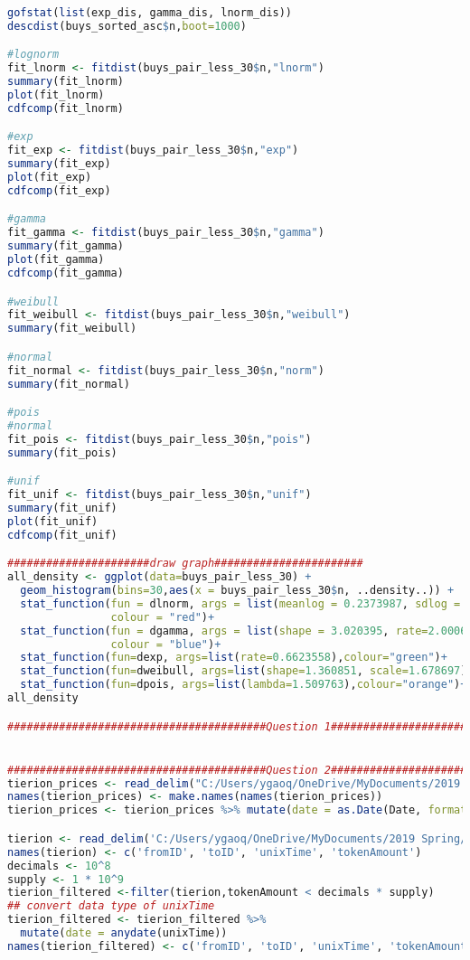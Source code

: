 \begin{lstlisting}[language=R]
gofstat(list(exp_dis, gamma_dis, lnorm_dis))
descdist(buys_sorted_asc$n,boot=1000)

#lognorm
fit_lnorm <- fitdist(buys_pair_less_30$n,"lnorm")
summary(fit_lnorm)
plot(fit_lnorm)
cdfcomp(fit_lnorm)

#exp
fit_exp <- fitdist(buys_pair_less_30$n,"exp")
summary(fit_exp)
plot(fit_exp)
cdfcomp(fit_exp)

#gamma
fit_gamma <- fitdist(buys_pair_less_30$n,"gamma")
summary(fit_gamma)
plot(fit_gamma)
cdfcomp(fit_gamma)

#weibull
fit_weibull <- fitdist(buys_pair_less_30$n,"weibull")
summary(fit_weibull)

#normal
fit_normal <- fitdist(buys_pair_less_30$n,"norm")
summary(fit_normal)

#pois
#normal
fit_pois <- fitdist(buys_pair_less_30$n,"pois")
summary(fit_pois)

#unif
fit_unif <- fitdist(buys_pair_less_30$n,"unif")
summary(fit_unif)
plot(fit_unif)
cdfcomp(fit_unif)

######################draw graph#######################
all_density <- ggplot(data=buys_pair_less_30) +
  geom_histogram(bins=30,aes(x = buys_pair_less_30$n, ..density..)) +
  stat_function(fun = dlnorm, args = list(meanlog = 0.2373987, sdlog = 0.4791316),
                colour = "red")+
  stat_function(fun = dgamma, args = list(shape = 3.020395, rate=2.000602),
                colour = "blue")+
  stat_function(fun=dexp, args=list(rate=0.6623558),colour="green")+
  stat_function(fun=dweibull, args=list(shape=1.360851, scale=1.678697),colour="yellow")+
  stat_function(fun=dpois, args=list(lambda=1.509763),colour="orange")+  xlab("No.Buys")
all_density

########################################Question 1############################################


########################################Question 2############################################
tierion_prices <- read_delim("C:/Users/ygaoq/OneDrive/MyDocuments/2019 Spring/Statistics/Project/Blockchain-Tokens-Data-Analytics/tierion", delim = "\t", col_names = T) #load token price data
names(tierion_prices) <- make.names(names(tierion_prices))
tierion_prices <- tierion_prices %>% mutate(date = as.Date(Date, format = '%m/%d/%Y'))

tierion <- read_delim('C:/Users/ygaoq/OneDrive/MyDocuments/2019 Spring/Statistics/Project/Blockchain-Tokens-Data-Analytics/networktierionTX.txt', delim = " ", col_names = F)
names(tierion) <- c('fromID', 'toID', 'unixTime', 'tokenAmount')
decimals <- 10^8
supply <- 1 * 10^9
tierion_filtered <-filter(tierion,tokenAmount < decimals * supply)
## convert data type of unixTime
tierion_filtered <- tierion_filtered %>%
  mutate(date = anydate(unixTime))
names(tierion_filtered) <- c('fromID', 'toID', 'unixTime', 'tokenAmount', 'date')


\end{lstlisting}
